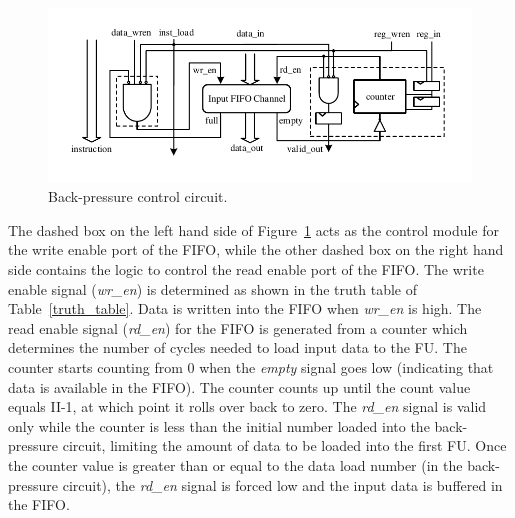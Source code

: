 \begin{figure}
	\centering
	\includegraphics{Figures/control.pdf}
	\caption{Back-pressure control circuit.}
	\label{back_pressure}
\end{figure}
	
The dashed box on the left hand side of Figure~\ref{back_pressure} acts as the control module for the write enable port of the FIFO, while the other dashed box on the right hand side contains the logic to control the read enable port of the FIFO. 
The write enable signal (\textit{wr\_en}) is determined as shown in the truth table of Table~\ref{truth_table}. 
Data is written into the FIFO when \textit{wr\_en} is high.
The read enable signal (\textit{rd\_en}) for the FIFO is generated from a counter which determines the number of cycles needed to load input data to the FU. 
The counter starts counting from 0 when the \textit{empty} signal goes low (indicating that data is available in the FIFO). The counter counts up until the count value equals II-1, at which point it rolls over back to zero.   
The \textit{rd\_en} signal is valid only while the counter is less than the initial number loaded into the back-pressure circuit, limiting the amount of data to be loaded into the first FU.
Once the counter value is greater than or equal to the data load number (in the back-pressure circuit), the \textit{rd\_en} signal is forced low and the input data is buffered in the FIFO.
	
